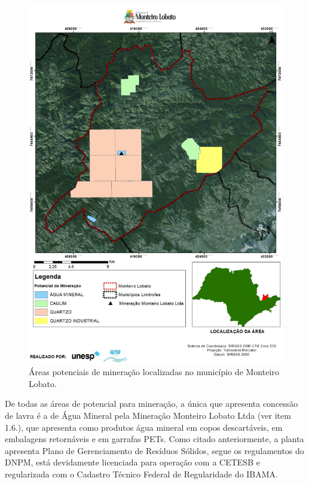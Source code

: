 	\begin{figure}
		\centering
		\includegraphics[width=1\linewidth]{produtos/prodtres/image091}
		\caption{Áreas potenciais de mineração localizadas no município de Monteiro Lobato.}
		\label{fig:image091}
	\end{figure}
	

	De todas as áreas de potencial para mineração, a única que apresenta concessão de lavra é a de Água Mineral pela Mineração Monteiro Lobato Ltda (ver item 1.6.), que apresenta como produtos água mineral em copos descartáveis, em embalagens retornáveis e em garrafas PETs. Como citado anteriormente, a planta apresenta Plano de Gerenciamento de Resíduos Sólidos, segue os regulamentos do DNPM, está devidamente licenciada para operação com a CETESB e regularizada com o Cadastro Técnico Federal de Regularidade do IBAMA.

